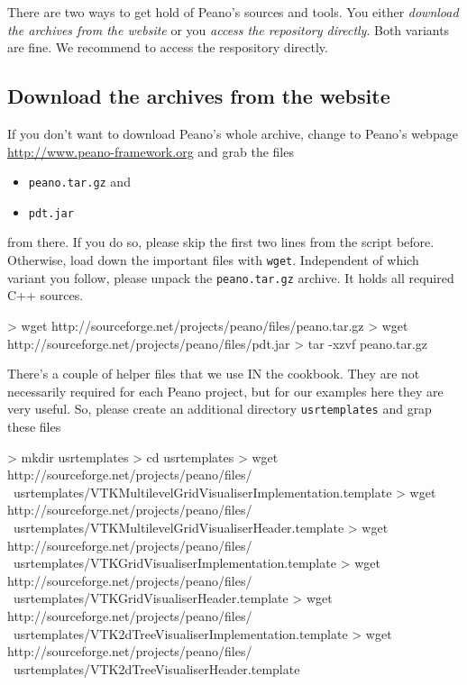 There are two ways to get hold of Peano's sources and tools. You either {\em
download the archives from the website} or you {\em access the repository
directly}.
Both variants are fine.
We recommend to access the respository directly.


\subsection{Download the archives from the website}

If you don't want to download Peano's whole archive, change to Peano's webpage
\url{http://www.peano-framework.org} and grab the files
\begin{itemize}
  \item \texttt{peano.tar.gz} and
  \item \texttt{pdt.jar}
\end{itemize}
from there. If you do so, please skip the first two lines from the script
before. Otherwise, load down the important files with \texttt{wget}. 
Independent of which variant you follow, please unpack the \texttt{peano.tar.gz}
archive. 
It holds all required C++ sources.

\begin{code}
> wget http://sourceforge.net/projects/peano/files/peano.tar.gz
> wget http://sourceforge.net/projects/peano/files/pdt.jar
> tar -xzvf peano.tar.gz
\end{code}


\noindent
There's a couple of helper files that we use IN the
cookbook. 
They are not necessarily required for each Peano project, but for our examples
here they are very useful.
So, please create an additional directory \texttt{usrtemplates} and grap
these files

\begin{code}
> mkdir usrtemplates
> cd usrtemplates
> wget http://sourceforge.net/projects/peano/files/ \
  usrtemplates/VTKMultilevelGridVisualiserImplementation.template 
> wget http://sourceforge.net/projects/peano/files/ \
  usrtemplates/VTKMultilevelGridVisualiserHeader.template 
> wget http://sourceforge.net/projects/peano/files/ \
  usrtemplates/VTKGridVisualiserImplementation.template 
> wget http://sourceforge.net/projects/peano/files/ \
  usrtemplates/VTKGridVisualiserHeader.template 
> wget http://sourceforge.net/projects/peano/files/ \
  usrtemplates/VTK2dTreeVisualiserImplementation.template 
> wget http://sourceforge.net/projects/peano/files/ \
  usrtemplates/VTK2dTreeVisualiserHeader.template 
\end{code}

